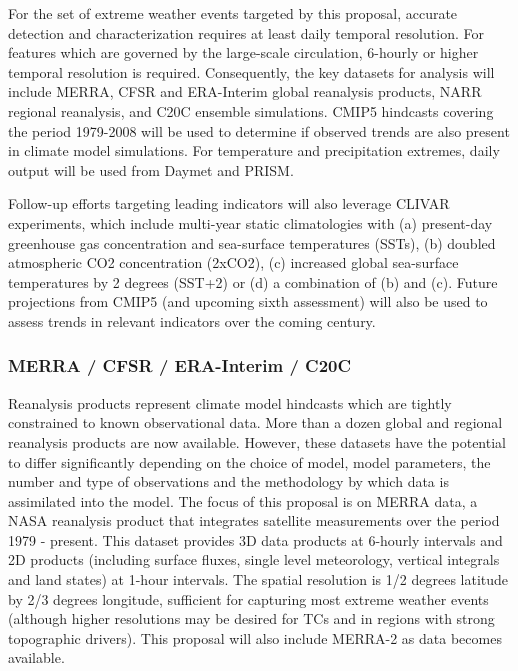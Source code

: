 \documentclass[11pt]{article}
\newcommand\citep{\cite}
\begin{document}
For the set of extreme weather events targeted by this proposal, accurate detection and characterization requires at least daily temporal resolution.  For features which are governed by the large-scale circulation, 6-hourly or higher temporal resolution is required.  Consequently, the key datasets for analysis will include MERRA, CFSR and ERA-Interim global reanalysis products, NARR regional reanalysis, and C20C ensemble simulations.  CMIP5 hindcasts covering the period 1979-2008 will be used to determine if observed trends are also present in climate model simulations.  For temperature and precipitation extremes, daily output will be used from Daymet and PRISM.

Follow-up efforts targeting leading indicators will also leverage CLIVAR experiments, which include multi-year static climatologies with (a) present-day greenhouse gas concentration and sea-surface temperatures (SSTs), (b) doubled atmospheric CO2 concentration (2xCO2), (c) increased global sea-surface temperatures by 2 degrees (SST+2) or (d) a combination of (b) and (c).  Future projections from CMIP5 (and upcoming sixth assessment) will also be used to assess trends in relevant indicators over the coming century.

\subsubsection*{MERRA / CFSR / ERA-Interim / C20C} \label{sec:MERRA}

Reanalysis products represent climate model hindcasts which are tightly constrained to known observational data.  More than a dozen global and regional reanalysis products are now available.  However, these datasets have the potential to differ significantly depending on the choice of model,  model parameters, the number and type of observations and the methodology by which data is assimilated into the model.  The focus of this proposal is on MERRA \citep{rienecker2011merra} data, a NASA reanalysis product that integrates satellite measurements over the period 1979 - present.  This dataset provides 3D data products at 6-hourly intervals and 2D products (including surface fluxes, single level meteorology, vertical integrals and land states) at 1-hour intervals.  The spatial resolution is 1/2 degrees latitude by 2/3 degrees longitude, sufficient for capturing most extreme weather events (although higher resolutions may be desired for TCs and in regions with strong topographic drivers).  This proposal will also include MERRA-2 as data becomes available.
\end{document}
